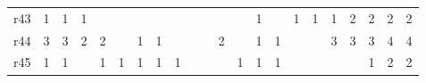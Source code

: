 {\begin{tabular}{l*{21}{r}}
r43& \cellcolor{magenta!10} 1& \cellcolor{magenta!10} 1& \cellcolor{magenta!10} 1& & & & & & & & & & \cellcolor{magenta!10} 1& & \cellcolor{magenta!10} 1& \cellcolor{magenta!10} 1& \cellcolor{magenta!10} 1& \cellcolor{white} 2& \cellcolor{white} 2& \cellcolor{white} 2& \cellcolor{white} 2\\ 
r44& \cellcolor{cyan!10} 3& \cellcolor{cyan!10} 3& \cellcolor{cyan!10} 2& \cellcolor{cyan!10} 2& & \cellcolor{cyan!10} 1& \cellcolor{cyan!10} 1& & & & \cellcolor{cyan!10} 2& & \cellcolor{cyan!10} 1& \cellcolor{cyan!10} 1& & & \cellcolor{cyan!10} 3& \cellcolor{cyan!10} 3& \cellcolor{cyan!10} 3& \cellcolor{white} 4& \cellcolor{white} 4\\ 
r45& \cellcolor{cyan!10} 1& \cellcolor{cyan!10} 1& & \cellcolor{cyan!10} 1& \cellcolor{cyan!10} 1& \cellcolor{cyan!10} 1& \cellcolor{cyan!10} 1& \cellcolor{cyan!10} 1& & & & \cellcolor{cyan!10} 1& \cellcolor{cyan!10} 1& \cellcolor{cyan!10} 1& & & & & \cellcolor{cyan!10} 1& \cellcolor{white} 2& \cellcolor{white} 2\\ 
\bottomrule
\end{tabular}
}
